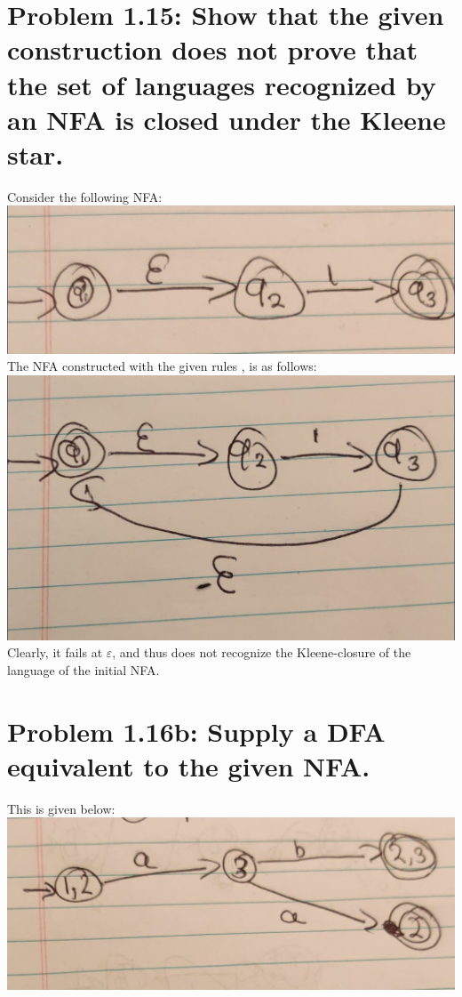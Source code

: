 \documentclass[12pt]{article}
\begin{document}
\section*{Problem 1.15: Show that the given construction does not prove that the set of languages recognized by an NFA is closed under the Kleene star.}
Consider the following NFA: \\
\newline
\includegraphics[width=0.5\linewidth]{problem115i.jpg} \\
\newline
The NFA constructed with the given rules , is as follows: \\
\newline
\includegraphics[width=0.5\linewidth]{problem115ii.jpg} \\
\newline
Clearly, it fails at $\varepsilon$, and thus does not recognize the Kleene-closure of the language of the initial NFA.

\section*{Problem 1.16b: Supply a DFA equivalent to the given NFA.}
This is given below: \\
\newline
\includegraphics[width=0.5\linewidth]{problem116b.jpg}
\end{document}

